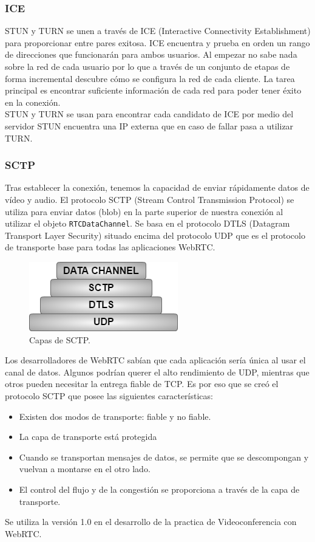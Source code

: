 \subsubsection*{ICE}
STUN y TURN se unen a través de ICE (Interactive Connectivity Establishment) para proporcionar entre pares exitosa. ICE encuentra y prueba en orden un rango de direcciones que funcionarán para ambos usuarios. Al empezar no sabe nada sobre la red de cada usuario por lo que a través de un conjunto de etapas de forma incremental descubre cómo se configura la red de cada cliente. La tarea principal es encontrar suficiente información de cada red para poder tener éxito en la conexión.
\\STUN y TURN se usan para encontrar cada candidato de ICE por medio del servidor STUN encuentra una IP externa que en caso de fallar pasa a utilizar TURN.
\subsubsection*{SCTP}
Tras establecer la conexión, tenemos la capacidad de enviar rápidamente datos de vídeo y audio. El protocolo SCTP (Stream Control Transmission Protocol) se utiliza para enviar datos (blob) en la parte superior de nuestra conexión al utilizar el objeto \texttt{RTCDataChannel}. Se basa en el protocolo DTLS (Datagram Transport Layer Security) situado encima del protocolo UDP que es el protocolo de transporte base para todas las aplicaciones WebRTC.
\begin{figure}[!h]
\begin{center}
   \includegraphics[width=0.4\linewidth]{Figures/SCTP_Example}
  \decoRule
  \caption[Capas de SCTP]{Capas de SCTP.}
\label{fig:SCTP_Example}
\end{center}
\end{figure}

Los desarrolladores de WebRTC sabían que cada aplicación sería única al usar el canal de datos. Algunos podrían querer el alto rendimiento de UDP, mientras que otros pueden necesitar la entrega fiable de TCP. Es por eso que se creó el protocolo SCTP que posee las siguientes características:
\begin{itemize}
\item Existen dos modos de transporte: fiable y no fiable.
\item La capa de transporte está protegida
\item Cuando se transportan mensajes de datos, se permite que se descompongan y vuelvan a montarse en el otro lado.
\item El control del flujo y de la congestión se proporciona a través de la capa de transporte.
\end{itemize}
Se utiliza la versión 1.0 en el desarrollo de la practica de Videoconferencia con WebRTC.
